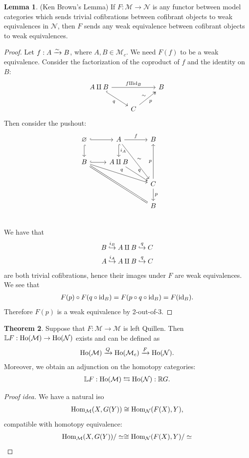 \documentclass[12pt]{amsart}
\theoremstyle{definition}
\newtheorem{theorem}{Theorem}[section]
\newtheorem{lemma}[theorem]{Lemma}
\let\emptyset\varnothing
\begin{document}
\begin{lemma} (Ken Brown's Lemma) If $F: \mathcal{M} \to \mathcal{N}$ is any functor between model categories which sends trivial cofibrations between cofibrant objects to weak equivalences in $\mathcal{N}$, then $F$ sends any weak equivalence between cofibrant objects to weak equivalences.
\end{lemma}
\begin{proof} Let $f: A \xrightarrow{\sim} B$, where $A,B \in \mathcal{M}_c$. We need $F(f)$ to be a weak equivalence. Consider the factorization of the coproduct of $f$ and the identity on $B$:
\[ \begin{tikzcd}
    A\amalg B\ar[rr,"f\amalg \id_B"]\ar[dr,hook,"q" below left] &  & B\\
     & C\ar[ur,"\sim" above left,"p" below right,two heads] &
\end{tikzcd} \]
Then consider the pushout:
\[ \begin{tikzcd}
    \emptyset\rar[hook]\dar[hook] & A\dar[hook,"i_A"]\rar["f"]\ar[ddr,"\sim"] & B & \\
    B\rar[hook]\ar[drr,"q"]\ar[ddrr,equal] & A\amalg B\ar[dr,"q"] &  & \\
     &  & C\dar["p"]\ar[uu,"p"] & \\
     &  & B & \\
\end{tikzcd} \]
We have that
\begin{align*}
    B \overset{i_B}{\hookrightarrow} A\amalg B \overset{q}{\hookrightarrow} C \\
    A \overset{i_A}{\hookrightarrow} A\amalg B \overset{q}{\hookrightarrow} C 
\end{align*}
are both trivial cofibrations, hence their images under $F$ are weak equivalences. We see that
\begin{align*}
    F(p)\circ F(q\circ \text{id}_B) = F(p\circ q\circ \text{id}_B) = F(\text{id}_B).
\end{align*}
Therefore $F(p)$ is a weak equivalence by 2-out-of-3.
\end{proof}

\begin{theorem} Suppose that $F:\mathcal{M}\to \mathcal{M}$ is left Quillen. Then $\mathbb{L}F:\text{Ho}(\mathcal{M})\to \text{Ho}(\mathcal{N})$ exists and can be defined as
\begin{align*}
    \text{Ho}(\mathcal{M})\xrightarrow{Q} \text{Ho}(\mathcal{M}_c) \xrightarrow{F} \text{Ho}(\mathcal{N}).
\end{align*}
Moreover, we obtain an adjunction on the homotopy categories:
\begin{align*}
    \mathbb{L}F: \text{Ho}(\mathcal{M}) \leftrightarrows \text{Ho}(\mathcal{N}): \mathbb{R}G.
\end{align*}
\end{theorem}
\begin{proof}[Proof idea] We have a natural iso
\begin{align*}
    \text{Hom}_\mathcal{M}(X,G(Y)) \cong \text{Hom}_\mathcal{N}(F(X),Y),
\end{align*}
compatible with homotopy equivalence:
\begin{align*}
    \text{Hom}_\mathcal{M}(X,G(Y))/\simeq \cong \text{Hom}_\mathcal{N}(F(X),Y)/\simeq
\end{align*}
\end{proof}
\end{document}
